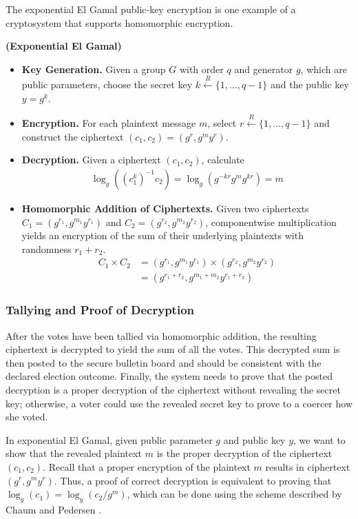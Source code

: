 The exponential El Gamal public-key encryption \cite{elgamal} is one example of a cryptosystem that supports homomorphic encryption.
\begin{definition}
\textbf{(Exponential El Gamal)}
\begin{itemize}
\item \textbf{Key Generation.} Given a group $G$ with order $q$ and generator $g$, which are public parameters, choose the secret key $k \xleftarrow{R} \{1, \dotsc, q-1\}$ and the public key $y = g^k$.
\item \textbf{Encryption.} For each plaintext message $m$, select $r \xleftarrow{R} \{1, \dotsc, q-1\}$ and construct the ciphertext $(c_1, c_2) = (g^r, g^m y^r)$.
\item \textbf{Decryption.} Given a ciphertext $(c_1, c_2)$, calculate
\begin{align*}
\log_g\left((c_1^k)^{-1} c_2\right) = \log_g\left(g^{-kr} g^m g^{kr}\right) = m
\end{align*}
\item \textbf{Homomorphic Addition of Ciphertexts.} Given two ciphertexts $C_1 = (g^{r_1}, g^{m_1} y^{r_1})$ and $C_2 = (g^{r_2}, g^{m_2} y^{r_2})$, componentwise multiplication yields an encryption of the sum of their underlying plaintexts with randomness $r_1 + r_2$.
\begin{align*}
C_1 \times C_2 &= (g^{r_1}, g^{m_1} y^{r_1}) \times (g^{r_2}, g^{m_2} y^{r_2}) \\
&= (g^{r_1 + r_2}, g^{m_1 + m_2} y^{r_1 + r_2})
\end{align*}
\end{itemize}
\end{definition}

\subsubsection{Tallying and Proof of Decryption}

After the votes have been tallied via homomorphic addition, the resulting ciphertext is decrypted to yield the sum of all the votes. This decrypted sum is then posted to the secure bulletin board and should be consistent with the declared election outcome. Finally, the system needs to prove that the posted decryption is a proper decryption of the ciphertext without revealing the secret key; otherwise, a voter could use the revealed secret key to prove to a coercer how she voted.

In exponential El Gamal, given public parameter $g$ and public key $y$, we want to show that the revealed plaintext $m$ is the proper decryption of the ciphertext $(c_1, c_2)$. Recall that a proper encryption of the plaintext $m$ results in ciphertext $(g^r, g^m y^r)$. Thus, a proof of correct decryption is equivalent to proving that $\log_{g}(c_1) = \log_{y}(c_2/g^m)$, which can be done using the scheme described by Chaum and Pedersen \cite{chaum-pedersen}.

